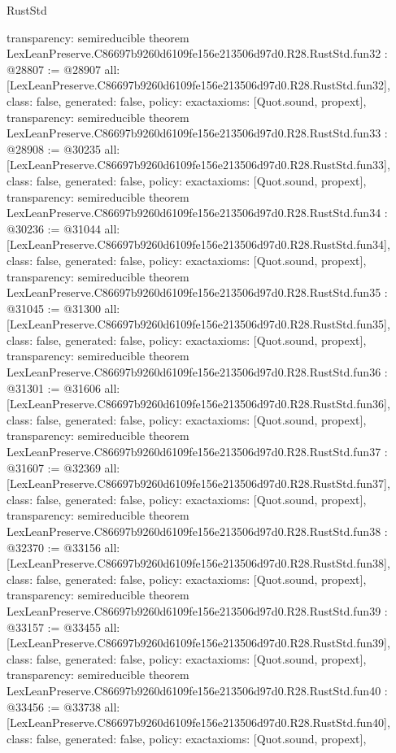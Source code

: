 \begin{lexlean}{RustStd}
\begin{coremodule}
{  transparency: semireducible
}
theorem LexLeanPreserve.C86697b9260d6109fe156e213506d97d0.R28.RustStd.fun32 : @28807 := @28907 {
  all: [LexLeanPreserve.C86697b9260d6109fe156e213506d97d0.R28.RustStd.fun32],
  class: false,
  generated: false,
  policy: exact{axioms: [Quot.sound, propext]},
  transparency: semireducible
}
theorem LexLeanPreserve.C86697b9260d6109fe156e213506d97d0.R28.RustStd.fun33 : @28908 := @30235 {
  all: [LexLeanPreserve.C86697b9260d6109fe156e213506d97d0.R28.RustStd.fun33],
  class: false,
  generated: false,
  policy: exact{axioms: [Quot.sound, propext]},
  transparency: semireducible
}
theorem LexLeanPreserve.C86697b9260d6109fe156e213506d97d0.R28.RustStd.fun34 : @30236 := @31044 {
  all: [LexLeanPreserve.C86697b9260d6109fe156e213506d97d0.R28.RustStd.fun34],
  class: false,
  generated: false,
  policy: exact{axioms: [Quot.sound, propext]},
  transparency: semireducible
}
theorem LexLeanPreserve.C86697b9260d6109fe156e213506d97d0.R28.RustStd.fun35 : @31045 := @31300 {
  all: [LexLeanPreserve.C86697b9260d6109fe156e213506d97d0.R28.RustStd.fun35],
  class: false,
  generated: false,
  policy: exact{axioms: [Quot.sound, propext]},
  transparency: semireducible
}
theorem LexLeanPreserve.C86697b9260d6109fe156e213506d97d0.R28.RustStd.fun36 : @31301 := @31606 {
  all: [LexLeanPreserve.C86697b9260d6109fe156e213506d97d0.R28.RustStd.fun36],
  class: false,
  generated: false,
  policy: exact{axioms: [Quot.sound, propext]},
  transparency: semireducible
}
theorem LexLeanPreserve.C86697b9260d6109fe156e213506d97d0.R28.RustStd.fun37 : @31607 := @32369 {
  all: [LexLeanPreserve.C86697b9260d6109fe156e213506d97d0.R28.RustStd.fun37],
  class: false,
  generated: false,
  policy: exact{axioms: [Quot.sound, propext]},
  transparency: semireducible
}
theorem LexLeanPreserve.C86697b9260d6109fe156e213506d97d0.R28.RustStd.fun38 : @32370 := @33156 {
  all: [LexLeanPreserve.C86697b9260d6109fe156e213506d97d0.R28.RustStd.fun38],
  class: false,
  generated: false,
  policy: exact{axioms: [Quot.sound, propext]},
  transparency: semireducible
}
theorem LexLeanPreserve.C86697b9260d6109fe156e213506d97d0.R28.RustStd.fun39 : @33157 := @33455 {
  all: [LexLeanPreserve.C86697b9260d6109fe156e213506d97d0.R28.RustStd.fun39],
  class: false,
  generated: false,
  policy: exact{axioms: [Quot.sound, propext]},
  transparency: semireducible
}
theorem LexLeanPreserve.C86697b9260d6109fe156e213506d97d0.R28.RustStd.fun40 : @33456 := @33738 {
  all: [LexLeanPreserve.C86697b9260d6109fe156e213506d97d0.R28.RustStd.fun40],
  class: false,
  generated: false,
  policy: exact{axioms: [Quot.sound, propext]},
}
\end{coremodule}
\end{lexlean}
